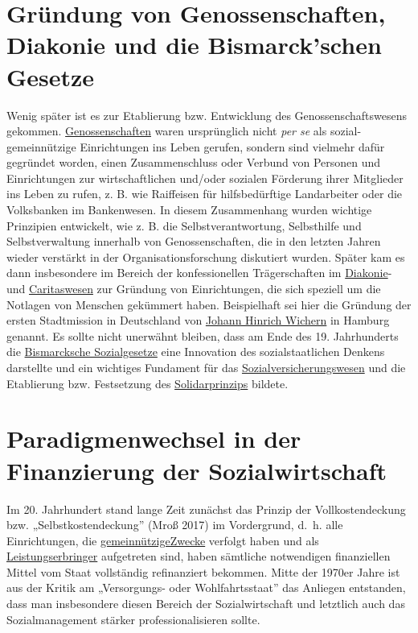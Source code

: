 \documentclass[
  letterpaper,
]{book}
\begin{document}
\section{Gründung von Genossenschaften, Diakonie und die Bismarck'schen
Gesetze}\label{gruendung}

Wenig später ist es zur Etablierung bzw. Entwicklung des
Genossenschaftswesens gekommen.
\href{https://de.wikipedia.org/wiki/Genossenschaft}{Genossenschaften}
waren ursprünglich nicht \emph{per se} als sozial-gemeinnützige
Einrichtungen ins Leben gerufen, sondern sind vielmehr dafür gegründet
worden, einen Zusammenschluss oder Verbund von Personen und
Einrichtungen zur wirtschaftlichen und/oder sozialen Förderung ihrer
Mitglieder ins Leben zu rufen, z. B. wie Raiffeisen für hilfsbedürftige
Landarbeiter oder die Volksbanken im Bankenwesen. In diesem Zusammenhang
wurden wichtige Prinzipien entwickelt, wie z. B. die
Selbstverantwortung, Selbsthilfe und Selbstverwaltung innerhalb von
Genossenschaften, die in den letzten Jahren wieder verstärkt in der
Organisationsforschung diskutiert wurden. Später kam es dann
insbesondere im Bereich der konfessionellen Trägerschaften im
\href{https://www.diakonie.de/}{Diakonie}- und
\href{https://www.caritas.de/}{Caritaswesen} zur Gründung von
Einrichtungen, die sich speziell um die Notlagen von Menschen gekümmert
haben. Beispielhaft sei hier die Gründung der ersten Stadtmission in
Deutschland von
\href{https://de.wikipedia.org/wiki/Johann_Hinrich_Wichern}{Johann
Hinrich Wichern} in Hamburg genannt. Es sollte nicht unerwähnt bleiben,
dass am Ende des 19. Jahrhunderts die
\href{https://www.bpb.de/themen/soziale-lage/rentenpolitik/289619/bismarcks-sozialgesetze/}{Bismarcksche
Sozialgesetze} eine Innovation des sozialstaatlichen Denkens darstellte
und ein wichtiges Fundament für das
\href{https://de.wikipedia.org/wiki/Sozialversicherung}{Sozialversicherungswesen}
und die Etablierung bzw. Festsetzung des
\href{https://www.bpb.de/themen/gesundheit/gesundheitspolitik/252319/das-solidarprinzip/}{Solidarprinzips}
bildete.

\section{Paradigmenwechsel in der Finanzierung der
Sozialwirtschaft}\label{paradigmenwechsel}

Im 20. Jahrhundert stand lange Zeit zunächst das Prinzip der
Vollkostendeckung bzw. „Selbstkostendeckung'' (Mroß 2017) im
Vordergrund, d.~h. alle Einrichtungen, die
\href{https://www.gesetze-im-internet.de/ao_1977/__52.html\#:~:text=(1)\%20Eine\%20K\%C3\%B6rperschaft\%20verfolgt\%20gemeinn\%C3\%BCtzige,sittlichem\%20Gebiet\%20selbstlos\%20zu\%20f\%C3\%B6rdern.}{gemeinnützigeZwecke}
verfolgt haben und als
\href{https://de.wikipedia.org/wiki/Leistungserbringer}{Leistungserbringer}
aufgetreten sind, haben sämtliche notwendigen finanziellen Mittel vom
Staat vollständig refinanziert bekommen. Mitte der 1970er Jahre ist aus
der Kritik am „Versorgungs- oder Wohlfahrtsstaat'' das Anliegen
entstanden, dass man insbesondere diesen Bereich der Sozialwirtschaft
und letztlich auch das Sozialmanagement stärker professionalisieren
sollte.
\end{document}
